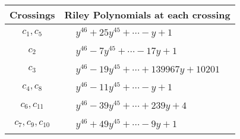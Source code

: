 \documentclass[1p]{elsarticle_modified}
\theoremstyle{definition}
\begin{document}
\begin{tabular}{m{50pt}|m{274pt}}
Crossings & \hspace{64pt}Riley Polynomials at each crossing \\
\hline $$\begin{aligned}c_{1},c_{5}\end{aligned}$$&$\begin{aligned}
&y^{46}+25 y^{45}+\cdots- y+1
\end{aligned}$\\
\hline $$\begin{aligned}c_{2}\end{aligned}$$&$\begin{aligned}
&y^{46}-7 y^{45}+\cdots-17 y+1
\end{aligned}$\\
\hline $$\begin{aligned}c_{3}\end{aligned}$$&$\begin{aligned}
&y^{46}-19 y^{45}+\cdots+139967 y+10201
\end{aligned}$\\
\hline $$\begin{aligned}c_{4},c_{8}\end{aligned}$$&$\begin{aligned}
&y^{46}-11 y^{45}+\cdots- y+1
\end{aligned}$\\
\hline $$\begin{aligned}c_{6},c_{11}\end{aligned}$$&$\begin{aligned}
&y^{46}-39 y^{45}+\cdots+239 y+4
\end{aligned}$\\
\hline $$\begin{aligned}c_{7},c_{9},c_{10}\end{aligned}$$&$\begin{aligned}
&y^{46}+49 y^{45}+\cdots-9 y+1
\end{aligned}$\\
\hline
\end{tabular}
\vskip 2pc
\end{document}
